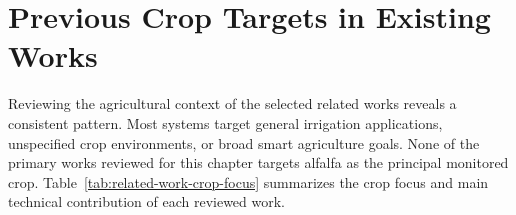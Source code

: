 \section{Previous Crop Targets in Existing Works}
\label{sec:crop-targets}

Reviewing the agricultural context of the selected related works reveals a
consistent pattern. Most systems target general irrigation applications,
unspecified crop environments, or broad smart agriculture goals. None of the
primary works reviewed for this chapter targets alfalfa as the principal
monitored crop. Table~\ref{tab:related-work-crop-focus} summarizes the crop
focus and main technical contribution of each reviewed work.

